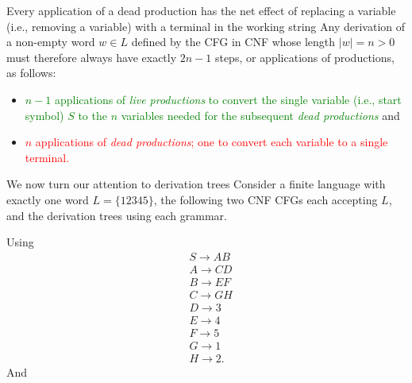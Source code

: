 \documentclass{report}
\begin{document}
\begin{itemize}
            \bigbreak \noindent 
            Every application of a dead production has the net effect of replacing a variable (i.e., removing a variable) with a terminal in the working string
            \bigbreak \noindent 
            Any derivation of a non-empty word \( w \in L \) defined by the CFG in CNF whose length \( |w| = n > 0 \) must therefore always have exactly \( 2n - 1 \) steps, or applications of productions, as follows:
            \begin{itemize}
                \item \textcolor{green}{\( n - 1 \) applications of \textit{live productions} to convert the single variable (i.e., start symbol) \( S \) to the \( n \) variables needed for the subsequent \textit{dead productions}} and
                \item \textcolor{red}{\( n \) applications of \textit{dead productions}; one to convert each variable to a single terminal.}
            \end{itemize}
            \bigbreak \noindent 
            We now turn our attention to derivation trees
            \bigbreak \noindent 
            Consider a finite language with exactly one word $L=\{12345\}$, the following two CNF CFGs each accepting $L$, and the derivation trees using each grammar.
            \bigbreak \noindent 
            \begin{figure}[ht]
                \centering
                \label{fig:helloworld2}
            \end{figure}
            \bigbreak \noindent 
            Using 
            \begin{align*}
                &S \to AB \\
                &A \to CD \\
                &B \to EF \\
                &C \to GH \\
                &D \to 3 \\
                &E \to 4 \\
                &F \to 5 \\
                &G \to 1 \\
                &H \to 2
            .\end{align*}
            \bigbreak \noindent 
            And 
            \begin{figure}[ht]
                \centering
                \label{fig:inspace2}
            \end{figure}

\end{itemize}
\end{document}
